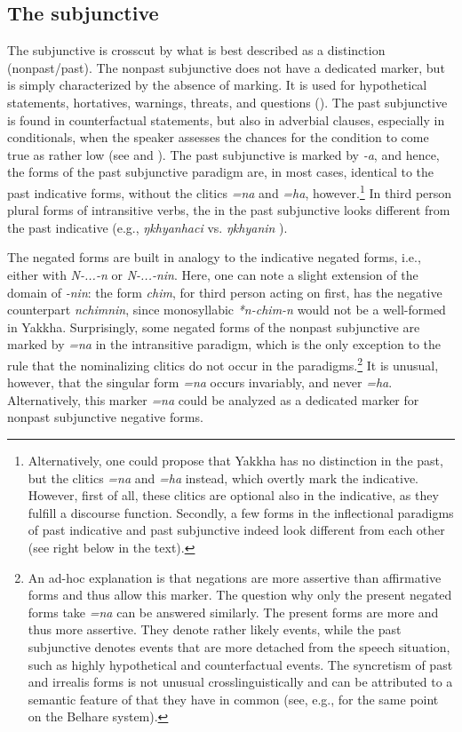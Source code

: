 \subsection{The subjunctive}

The subjunctive  is crosscut by what is best described as a  distinction (nonpast/past). The nonpast subjunctive does not have a dedicated marker, but is simply characterized by the absence of  marking. It is used for hypothetical statements, hortatives, warnings, threats, and  questions (). The past subjunctive is found in counterfactual statements, but also in adverbial clauses, especially in conditionals, when the speaker assesses the chances for the condition to come true as rather low (see  and ). The past subjunctive is marked by \emph{-a}, and hence, the forms of the past subjunctive paradigm are, in most cases, identical to the past indicative forms, without the clitics \emph{=na} and \emph{=ha}, however.\footnote{Alternatively, one could propose that Yakkha has no  distinction in the past, but the clitics  \emph{=na} and \emph{=ha} instead, which overtly mark the indicative. However, first of all, these clitics are optional also in the indicative, as they fulfill a discourse function. Secondly, a few forms in the inflectional paradigms of past indicative and past subjunctive indeed look different from each other (see right below in the text).} In third person plural forms of intransitive verbs, the  in the past subjunctive looks different from the past indicative (e.g., \emph{ŋkhyanhaci}  vs. \emph{ŋkhyanin} ). 

\largerpage
The negated forms are built in analogy to the indicative negated forms, i.e., either with \emph{N-...-n} or \emph{N-...-nin}. Here, one can note a slight extension of the domain of \emph{-nin}: the form \emph{chim}, for third person acting on first, has the negative counterpart \emph{nchimnin}, since monosyllabic  \emph{*n-chim-n } would not be a well-formed  in Yakkha. Surprisingly, some negated forms of the nonpast subjunctive are marked by \emph{=na} in the intransitive paradigm, which is the only exception to the rule that the nominalizing clitics do not occur in the  paradigms.\footnote{An ad-hoc explanation is that negations are more assertive than affirmative forms and thus allow this marker. The question why only the present negated forms take \emph{=na} can be answered similarly. The present forms are more  and thus more assertive. They denote rather likely events, while the past subjunctive denotes events that are more detached from the speech situation, such as highly hypothetical and counterfactual events. The syncretism of past and irrealis forms is not unusual crosslinguistically and can be attributed to a semantic feature of  that they have in common (see, e.g., \citet[88]{Bickel1996Aspect} for the same point on the Belhare system).} It is unusual, however, that the singular form \emph{=na} occurs invariably, and never \emph{=ha}. Alternatively, this marker \emph{=na} could be analyzed as a dedicated marker for nonpast subjunctive negative forms.

